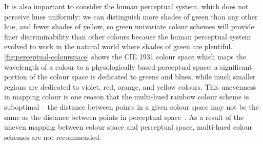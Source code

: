\documentclass[letterpaper]{ar-1col}\usepackage[]{graphicx}\usepackage[]{color}
\begin{document}
It is also important to consider the human perceptual system, which does not perceive hues uniformly: we can distinguish more shades of green than any other hue, and fewer shades of yellow, so green univariate colour schemes will provide finer discriminability than other colours because the human perceptual system evolved to work in the natural world where shades of green are plentiful. \autoref{fig:perceptual-colourspace} shows the CIE 1931 colour space which maps the wavelength of a colour to a physologically based perceptual space; a significant portion of the colour space is dedicated to greens and blues, while much smaller regions are dedicated to violet, red, orange, and yellow colours. This unevenness in mapping colour is one reason that the multi-hued rainbow colour scheme is suboptimal -- the distance between points in a given colour space may not be the same as the distance between points in perceptual space~\citep{lightEndRainbowColor2004,wakitaSmartColorDisambiguationFramework2005,borlandRainbowColorMap2007}. As a result of the uneven mapping between colour space and perceptual space, multi-hued colour schemes are not recommended.
\end{document}
